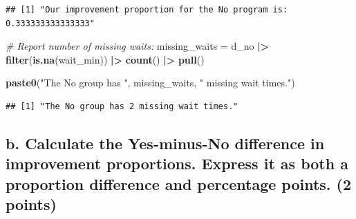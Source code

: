 \documentclass[
]{article}
\newenvironment{Shaded}{\begin{snugshade}}{\end{snugshade}}
\newcommand{\CommentTok}[1]{\textcolor[rgb]{0.56,0.35,0.01}{\textit{#1}}}
\newcommand{\FunctionTok}[1]{\textcolor[rgb]{0.13,0.29,0.53}{\textbf{#1}}}
\newcommand{\NormalTok}[1]{#1}
\newcommand{\OtherTok}[1]{\textcolor[rgb]{0.56,0.35,0.01}{#1}}
\newcommand{\SpecialCharTok}[1]{\textcolor[rgb]{0.81,0.36,0.00}{\textbf{#1}}}
\newcommand{\StringTok}[1]{\textcolor[rgb]{0.31,0.60,0.02}{#1}}
\begin{document}
\begin{verbatim}
## [1] "Our improvement proportion for the No program is: 0.333333333333333"
\end{verbatim}

\begin{Shaded}
\begin{Highlighting}[]
\CommentTok{\# Report number of missing waits:}
\NormalTok{missing\_waits }\OtherTok{=}\NormalTok{ d\_no }\SpecialCharTok{|\textgreater{}} 
  \FunctionTok{filter}\NormalTok{(}\FunctionTok{is.na}\NormalTok{(wait\_min)) }\SpecialCharTok{|\textgreater{}} 
  \FunctionTok{count}\NormalTok{() }\SpecialCharTok{|\textgreater{}} 
  \FunctionTok{pull}\NormalTok{()}

\FunctionTok{paste0}\NormalTok{(}\StringTok{"The No group has "}\NormalTok{, missing\_waits, }\StringTok{" missing wait times."}\NormalTok{)}
\end{Highlighting}
\end{Shaded}

\begin{verbatim}
## [1] "The No group has 2 missing wait times."
\end{verbatim}

\subsection{b. Calculate the Yes-minus-No difference in improvement
proportions. Express it as both a proportion difference and percentage
points. (2
points)}\label{b.-calculate-the-yes-minus-no-difference-in-improvement-proportions.-express-it-as-both-a-proportion-difference-and-percentage-points.-2-points}
\end{document}
